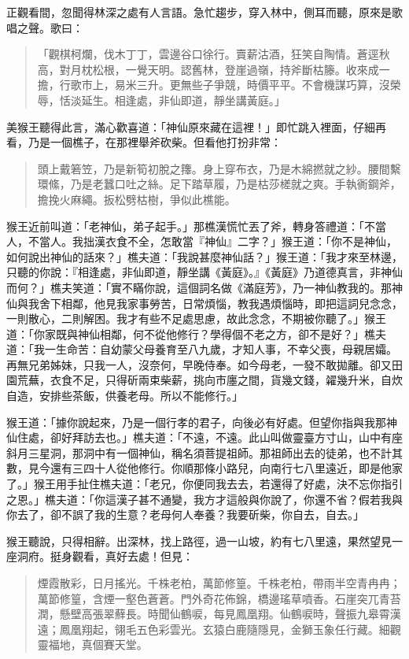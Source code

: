 正觀看間，忽聞得林深之處有人言語。急忙趨步，穿入林中，側耳而聽，原來是歌唱之聲。歌曰：
\begin{quote}
「觀棋柯爛，伐木丁丁，雲邊谷口徐行。賣薪沽酒，狂笑自陶情。蒼逕秋高，對月枕松根，一覺天明。認舊林，登崖過嶺，持斧斷枯籐。收來成一擔，行歌市上，易米三升。更無些子爭競，時價平平。不會機謀巧算，沒榮辱，恬淡延生。相逢處，非仙即道，靜坐講黃庭。」
\end{quote}

美猴王聽得此言，滿心歡喜道：「神仙原來藏在這裡！」即忙跳入裡面，仔細再看，乃是一個樵子，在那裡舉斧砍柴。但看他打扮非常：
\begin{quote}
頭上戴箬笠，乃是新筍初脫之籜。身上穿布衣，乃是木綿撚就之紗。腰間繫環絛，乃是老蠶口吐之絲。足下踏草履，乃是枯莎槎就之爽。手執衠鋼斧，擔挽火麻繩。扳松劈枯樹，爭似此樵能。
\end{quote}

猴王近前叫道：「老神仙，弟子起手。」那樵漢慌忙丟了斧，轉身答禮道：「不當人，不當人。我拙漢衣食不全，怎敢當『神仙』二字？」猴王道：「你不是神仙，如何說出神仙的話來？」樵夫道：「我說甚麼神仙話？」猴王道：「我才來至林邊，只聽的你說：『相逢處，非仙即道，靜坐講《黃庭》。』《黃庭》乃道德真言，非神仙而何？」樵夫笑道：「實不瞞你說，這個詞名做《滿庭芳》，乃一神仙教我的。那神仙與我舍下相鄰，他見我家事勞苦，日常煩惱，教我遇煩惱時，即把這詞兒念念，一則散心，二則解困。我才有些不足處思慮，故此念念，不期被你聽了。」猴王道：「你家既與神仙相鄰，何不從他修行？學得個不老之方，卻不是好？」樵夫道：「我一生命苦：自幼蒙父母養育至八九歲，才知人事，不幸父喪，母親居孀。再無兄弟姊妹，只我一人，沒奈何，早晚侍奉。如今母老，一發不敢拋離。卻又田園荒蕪，衣食不足，只得斫兩束柴薪，挑向市廛之間，貨幾文錢，糴幾升米，自炊自造，安排些茶飯，供養老母。所以不能修行。」

猴王道：「據你說起來，乃是一個行孝的君子，向後必有好處。但望你指與我那神仙住處，卻好拜訪去也。」樵夫道：「不遠，不遠。此山叫做靈臺方寸山，山中有座斜月三星洞，那洞中有一個神仙，稱名須菩提祖師。那祖師出去的徒弟，也不計其數，見今還有三四十人從他修行。你順那條小路兒，向南行七八里遠近，即是他家了。」猴王用手扯住樵夫道：「老兄，你便同我去去，若還得了好處，決不忘你指引之恩。」樵夫道：「你這漢子甚不通變，我方才這般與你說了，你還不省？假若我與你去了，卻不誤了我的生意？老母何人奉養？我要斫柴，你自去，自去。」

猴王聽說，只得相辭。出深林，找上路徑，過一山坡，約有七八里遠，果然望見一座洞府。挺身觀看，真好去處！但見：
\begin{quote}
煙霞散彩，日月搖光。千株老柏，萬節修篁。千株老柏，帶雨半空青冉冉；萬節修篁，含煙一壑色蒼蒼。門外奇花佈錦，橋邊瑤草噴香。石崖突兀青苔潤，懸壁高張翠蘚長。時聞仙鶴唳，每見鳳凰翔。仙鶴唳時，聲振九皋霄漢遠；鳳凰翔起，翎毛五色彩雲光。玄猿白鹿隨隱見，金獅玉象任行藏。細觀靈福地，真個賽天堂。
\end{quote}

